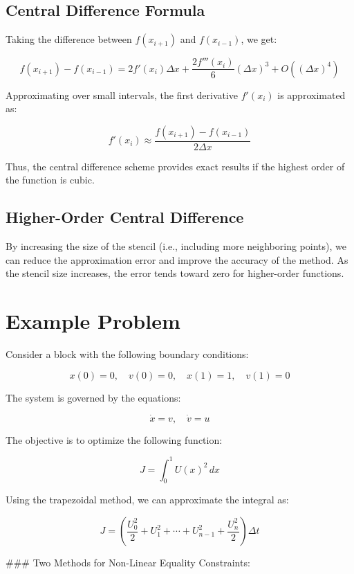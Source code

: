 \documentclass[12pt]{report} %
\begin{document}
\subsection{Central Difference Formula}
Taking the difference between \(f(x_{i+1})\) and \(f(x_{i-1})\), we get:

\begin{equation}
    f(x_{i+1}) - f(x_{i-1}) = 2 f'(x_i) \Delta x + \frac{2 f'''(x_i)}{6} (\Delta x)^3 + O((\Delta x)^4)
\end{equation}

Approximating over small intervals, the first derivative \(f'(x_i)\) is approximated as:

\begin{equation}
    f'(x_i) \approx \frac{f(x_{i+1}) - f(x_{i-1})}{2\Delta x}
\end{equation}

Thus, the central difference scheme provides exact results if the highest order of the function is cubic.

\subsection{Higher-Order Central Difference}
By increasing the size of the stencil (i.e., including more neighboring points), we can reduce the approximation error and improve the accuracy of the method. As the stencil size increases, the error tends toward zero for higher-order functions.

\section{Example Problem}
Consider a block with the following boundary conditions:

\[
x(0) = 0, \quad v(0) = 0, \quad x(1) = 1, \quad v(1) = 0
\]

The system is governed by the equations:

\[
\dot{x} = v, \quad \dot{v} = u
\]

The objective is to optimize the following function:

\[
J = \int_0^1 U(x)^2 \, dx
\]

Using the trapezoidal method, we can approximate the integral as:

\[
J = \left( \frac{U_0^2}{2} + U_1^2 + \cdots + U_{n-1}^2 + \frac{U_n^2}{2} \right) \Delta t
\]

### Two Methods for Non-Linear Equality Constraints:
\end{document}
